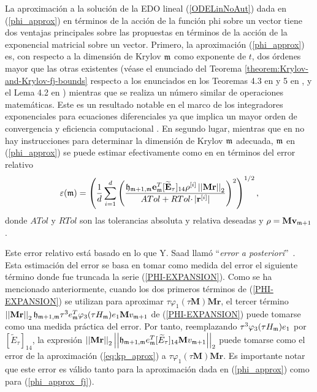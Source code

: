 La aproximación a la solución de la EDO lineal (\ref{ODELinNoAut}) dada en (\ref{phi_approx}) en términos de la acción de la función phi sobre un vector tiene dos ventajas principales sobre las propuestas \cite{hochbruck1997krylov,sidje1998expokit,jimenez2012convergence}
en términos de la acción de la exponencial matricial sobre un vector. Primero, la aproximación (\ref{phi_approx}) es, con respecto a la dimensión de Krylov $\mathfrak{m}$ como exponente de $t$, dos órdenes mayor que las otras existentes (véase el enunciado del Teorema \ref{theorem:Krylov-and-Krylov-fj-bounds} respecto a los enunciados en los Teoremas 4.3 en \cite{Saad92} y 5 en \cite{hochbruck1997krylov}, y el Lema 4.2 en \cite{jimenez2012convergence}) mientras que se realiza un número similar de operaciones matemáticas. Este es un resultado notable en el marco de los integradores exponenciales para ecuaciones diferenciales ya que implica un mayor orden de convergencia y eficiencia computacional \cite{naranjo2021locally}. En segundo lugar, mientras que en \cite{hochbruck1997krylov,sidje1998expokit,jimenez2012convergence} no hay instrucciones para determinar la dimensión de Krylov $\mathfrak{m}$ adecuada, $\mathfrak{m}$ en (\ref{phi_approx}) se puede estimar efectivamente como en \cite{naranjo2021locally,naranjo2023jacobian} en términos del error relativo
\begin{equation*}
\varepsilon(\mathfrak{m}) = \left(\frac{1}{d}\sum\limits_{i=1}^{d} \left(\frac{
	\mathfrak{h}_{\mathfrak{m}+1,\mathfrak{m}} \mathbf{e}_{\mathfrak{m}}^T
	[\widetilde{\mathbf{E}}_\tau]_{14} \rho^{[i]} \left\lvert \left\lvert \mathbf{Mr} \right\rvert \right\rvert_2}{ATol+ RTol\cdotp
	\rvert \mathbf{r}^{[i]}\rvert}\right)^{2}\right)^{1/2},
\end{equation*}
donde $ATol$ y $RTol$ son las tolerancias absoluta y relativa deseadas y $\mathbf{\rho} = \mathbf{M} \mathbf{v}_{\mathfrak{m}+1}$. 

Este error relativo está basado en lo que Y. Saad llamó ``\textit{error a posteriori}''~\cite{Saad92}. Esta estimación del error se basa en tomar como medida del error el siguiente término donde fue truncada la serie (\ref{PHI-EXPANSION}). Como se ha mencionado anteriormente, cuando los dos primeros términos de (\ref{PHI-EXPANSION}) se utilizan para aproximar $\tau\varphi_1(\tau \mathbf{M})\mathbf{Mr}$, el tercer término $\left\lvert\left\lvert \mathbf{Mr} \right\rvert\right\rvert_2 \mathfrak{h}_{\mathfrak{m}+1,\mathfrak{m}} \tau^{3} e_{\mathfrak{m}}^{T}\varphi_3( \tau H_{\mathfrak{m}})e_1 \mathbf{M} v_{\mathfrak{m}+1} $ de (\ref{PHI-EXPANSION}) puede tomarse como una medida práctica del error. Por tanto, reemplazando $\tau^3\varphi_3( \tau H_{\mathfrak{m}})e_1$ por $[\widetilde{E}_{\tau}]_{14}$, la expresión $\left\lvert \left\lvert \mathbf{Mr} \right\rvert\right\rvert_2 \left\lvert\left\lvert \mathfrak{h}_{\mathfrak{m}+1,\mathfrak{m}} e_{\mathfrak{m}}^{T}[\widetilde{E}_{\tau}]_{14} \mathbf{M} v_{\mathfrak{m}+1} \right\rvert\right\rvert_2$ puede tomarse como el error de la aproximación (\ref{eq:kp_aprox}) a $\tau\varphi_1(\tau \mathbf{M})\mathbf{Mr}$. Es importante notar que este error es válido tanto para la aproximación dada en (\ref{phi_approx}) como para (\ref{phi_approx_fj}).

